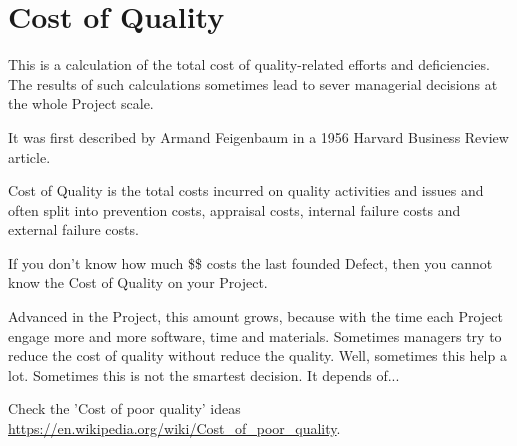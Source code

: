 \section{Cost of Quality}
\label{sec:Cost of Quality}

This is a calculation of the total cost of quality-related efforts and deficiencies. The results of such calculations sometimes lead to sever managerial decisions at the whole Project scale.

It was first described by Armand Feigenbaum in a 1956 Harvard Business Review article.

Cost of Quality is the total costs incurred on quality activities and issues and often split into prevention costs, appraisal costs, internal failure costs and external failure costs.

If you don't know how much \$\$ costs the last founded Defect, then you cannot know the Cost of Quality on your Project.

Advanced in the Project, this amount grows, because with the time each Project engage more and more software, time and materials. Sometimes managers try to reduce the cost of quality without reduce the quality. Well, sometimes this help a lot. Sometimes this is not the smartest decision. It depends of...

Check the 'Cost of poor quality' ideas \url{https://en.wikipedia.org/wiki/Cost_of_poor_quality}.